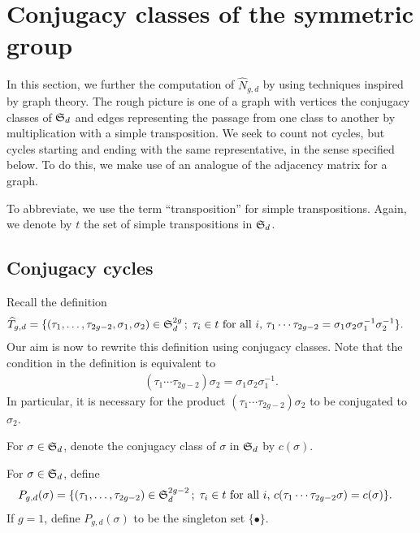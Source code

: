 \section{Conjugacy classes of the symmetric group}

In this section, we further the computation of $\widehat{N}_{g,d}$ by using techniques inspired by graph theory. The rough picture is one of a graph with vertices the conjugacy classes of $\operatorname{\mathfrak{S}}_d$ and edges representing the passage from one class to another by multiplication with a simple transposition. We seek to count not cycles, but cycles starting and ending with the same representative, in the sense specified below. To do this, we make use of an analogue of the adjacency matrix for a graph.

To abbreviate, we use the term ``transposition'' for simple transpositions. Again, we denote by $t$ the set of simple transpositions in $\operatorname{\mathfrak{S}}_d$.

\subsection{Conjugacy cycles}

Recall the definition
\begin{align*}
  \widehat{T}_{g,d} = \{(\tau_1,\dotsc,\tau_{2g-2},\sigma_1,\sigma_2)\in \operatorname{\mathfrak{S}}_d^{2g} \,;\; \tau_i\in t \text{ for all $i$, } &\tau_1\dotsm\tau_{2g-2}=\sigma_1\sigma_2\sigma_1^{-1}\sigma_2^{-1}\}.
 \end{align*}
Our aim is now to rewrite this definition using conjugacy classes. Note that the condition in the definition is equivalent to
\begin{align*} \label{eq:conj-cond}
 (\tau_1 \dotsm \tau_{2g-2})\sigma_2=\sigma_1\sigma_2\sigma_1^{-1}.
\end{align*}
In particular, it is necessary for the product $(\tau_1 \dotsm \tau_{2g-2})\sigma_2$ to be conjugated to $\sigma_2$.

For $\sigma\in\operatorname{\mathfrak{S}}_d$, denote the conjugacy class of $\sigma$ in $\operatorname{\mathfrak{S}}_d$ by $c(\sigma)$.
\begin{defi}
 For $\sigma \in \operatorname{\mathfrak{S}}_d$, define
 \begin{align*}
  P_{g,d}(\sigma) = \{(\tau_1,\dotsc,\tau_{2g-2})\in \operatorname{\mathfrak{S}}_d^{2g-2} \,;\; \tau_i\in t \text{ for all $i$, } &c(\tau_1\dotsm\tau_{2g-2}\sigma)=c(\sigma)\}.
 \end{align*}
 If $g=1$, define $P_{g,d}(\sigma)$ to be the singleton set $\{\bullet\}$.
\end{defi}

